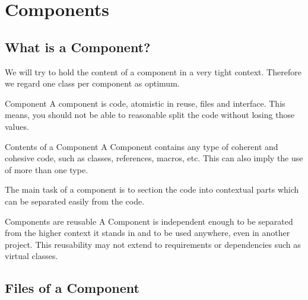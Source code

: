 %

\chapter{Components}
\label{cha:components}



\section{What is a Component?}
\label{sec:what-is-a-component}

We will try to hold the content of a component in a very tight context.
Therefore we regard one class per component as optimum.
%
\begin{definition*}{Component}
  \label{def:component}
  A component is code, atomistic in reuse, files and interface. This means,
  you should not be able to reasonable split the code without losing those
  values.
\end{definition*}

\begin{definition*}{Contents of a Component}
  \label{def:contents-component}
  A Component contains any type of coherent and cohesive code, such as classes,
  references, macros, etc. This can also imply the use of more than one type.
\end{definition*}
%
The main task of a component is to section the code into contextual parts which
can be separated easily from the \SYNEIGHT code.
%
\begin{rule*}{Components are reusable}
  \label{rule:components-portable}
  A Component is independent enough to be separated from the higher context it
  stands in and to be used anywhere, even in another project. This
  reusability may not extend to requirements or dependencies such as virtual
  classes.
\end{rule*}

\section{Files of a Component}
\label{sec:files-component}

